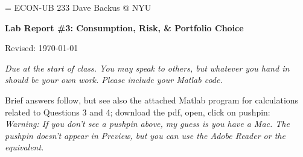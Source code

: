 \documentclass[11pt]{exam}
\begin{document}
\parskip=\bigskipamount
\parindent=0.0in
\thispagestyle{empty}
{\large ECON-UB 233 \hfill Dave Backus @ NYU}

\bigskip\bigskip
\centerline{\Large \bf Lab Report \#3: Consumption, Risk, \& Portfolio Choice}
\centerline{Revised: \today}

\bigskip
{\it Due at the start of class.
You may speak to others, but whatever you hand in should be your own work.
Please include your Matlab code.}

\begin{solution}
Brief answers follow,
but see also the attached Matlab program for calculations
related to Questions 3 and 4;
download the pdf, open, click on pushpin:
 \\
{\it Warning:  If you don't see a pushpin above, my guess is you have a Mac.
The pushpin doesn't appear in Preview,
but you can use the Adobe Reader or the equivalent.}
\end{solution}
\end{document}
